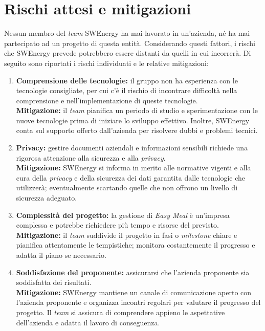 \section{Rischi attesi e mitigazioni}

Nessun membro del \textit{team} SWEnergy ha mai lavorato in un'azienda, né ha
mai partecipato ad un progetto di questa entità. Considerando questi fattori, i
rischi che SWEnergy prevede potrebbero essere distanti da quelli in cui
incorrerà. 
Di seguito sono riportati i rischi individuati e le relative mitigazioni:
\begin{enumerate}

\item \textbf{Comprensione delle tecnologie:} il gruppo non ha esperienza 
con le tecnologie consigliate, per cui c'è il rischio di incontrare 
difficoltà nella comprensione e nell'implementazione di queste tecnologie. \\
\textbf{Mitigazione:} il \textit{team} pianifica un periodo di studio e 
sperimentazione con 
le nuove tecnologie prima di iniziare lo sviluppo effettivo. Inoltre, SWEnergy
conta sul supporto offerto dall'azienda per risolvere dubbi e problemi tecnici.

\item \textbf{Privacy:} gestire documenti aziendali e 
informazioni sensibili richiede una rigorosa attenzione alla sicurezza e alla 
\textit{privacy}. \\
\textbf{Mitigazione:} SWEnergy si informa in merito alle normative vigenti
e alla
cura della \textit{privacy} e della sicurezza dei dati garantita dalle tecnologie che
utilizzerà; eventualmente scartando quelle che non offrono un livello di
sicurezza adeguato.

\item \textbf{Complessità del progetto:} la gestione di \textit{Easy Meal} è
un'impresa complessa e potrebbe richiedere più tempo e risorse del previsto. \\
\textbf{Mitigazione:} il \textit{team} suddivide il progetto in fasi o 
\textit{milestone} chiare e 
pianifica attentamente le tempistiche; monitora costantemente il progresso e
adatta il piano se necessario. 

\item \textbf{Soddisfazione del proponente:} assicurarsi che l'azienda proponente sia 
soddisfatta dei risultati. \\
\textbf{Mitigazione:} SWEnergy mantiene un canale di comunicazione aperto con 
l'azienda 
proponente e organizza incontri regolari per valutare il progresso del progetto. 
Il \textit{team} si assicura di comprendere appieno le aspettative dell'azienda 
e adatta il lavoro di conseguenza.
\end{enumerate}
